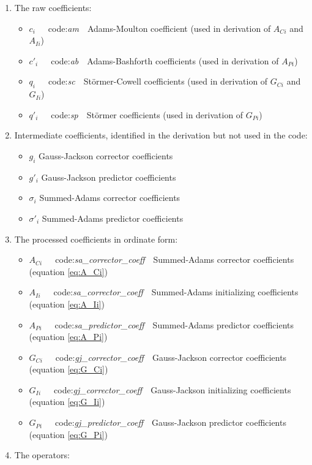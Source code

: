 \begin{enumerate}
 \item The raw coefficients:
 \begin{itemize}
  \item $c_i$\ \ \ code:\textit{am}\ \   Adams-Moulton coefficient (used in derivation of $A_{Ci}$ and $A_{Ii}$)
  \item $c'_i$\ \ \ code:\textit{ab}\ \  Adams-Bashforth coefficients (used in derivation of $A_{Pi}$)
  \item $q_i$\ \ \ code:\textit{sc}\ \   St\"ormer-Cowell coefficients (used in derivation of $G_{Ci}$ and $G_{Ii}$)
  \item $q'_i$\ \ \ code:\textit{sp}\ \  St\"ormer coefficients (used in derivation of $G_{Pi}$)
 \end{itemize}
 \item Intermediate coefficients, identified in the derivation but not used in the code:
 \begin{itemize}
  \item $g_i$ Gauss-Jackson corrector coefficients
  \item $g'_i$ Gauss-Jackson predictor coefficients
  \item $\sigma_i$ Summed-Adams corrector coefficients
  \item $\sigma'_i$ Summed-Adams predictor coefficients
 \end{itemize}
 \item The processed coefficients in ordinate form:
\begin{itemize}\label{sec:GJ_Math_Form_sum_arrays}
 \item $A_{Ci}$\ \ \ code:\textit{sa\_corrector\_coeff}\ \   
 Summed-Adams corrector coefficients (equation \ref{eq:A_Ci})
 \item $A_{Ii}$\ \ \ code:\textit{sa\_corrector\_coeff}\ \   
 Summed-Adams initializing coefficients (equation \ref{eq:A_Ii})
 \item $A_{Pi}$\ \ \ code:\textit{sa\_predictor\_coeff}\ \   
 Summed-Adams predictor coefficients (equation \ref{eq:A_Pi})
 \item $G_{Ci}$\ \ \ code:\textit{gj\_corrector\_coeff}\ \   
 Gauss-Jackson corrector coefficients (equation \ref{eq:G_Ci})
 \item $G_{Ii}$\ \ \ code:\textit{gj\_corrector\_coeff}\ \   
 Gauss-Jackson initializing coefficients (equation \ref{eq:G_Ii})
 \item $G_{Pi}$\ \ \ code:\textit{gj\_predictor\_coeff}\ \   
 Gauss-Jackson predictor coefficients (equation \ref{eq:G_Pi})
\end{itemize}
\item The operators:
\begin{itemize}


\end{itemize}
\end{enumerate}

